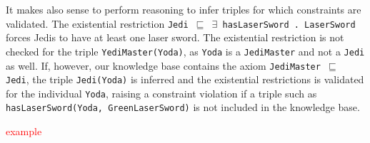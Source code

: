 \documentclass{llncs}
\newcommand{\ms}[1]{\texttt{#1}}
\begin{document}
It makes also sense to perform reasoning to infer triples for which constraints are validated.
The existential restriction \ms{Jedi $\sqsubseteq$ $\exists$ hasLaserSword . LaserSword} forces Jedis to have at least one laser sword.
The existential restriction is not checked for the triple \ms{YediMaster(Yoda)}, as \ms{Yoda} is a \ms{JediMaster} and not a \ms{Jedi} as well.
If, however, our knowledge base contains the axiom \ms{JediMaster $\sqsubseteq$ Jedi}, the triple \ms{Jedi(Yoda)} is inferred and the existential restrictions is validated for the individual \ms{Yoda}, raising a constraint violation if a triple such as \ms{hasLaserSword(Yoda, GreenLaserSword)} is not included in the knowledge base. 

\textcolor{red}{example}


%
%
\end{document}

